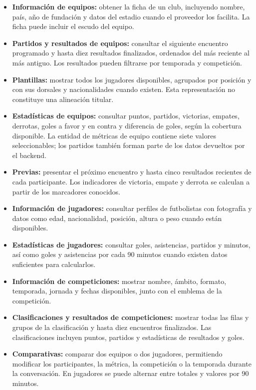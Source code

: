 \documentclass[11pt,a4paper]{article}
\begin{document}
\begin{itemize}
\item \textbf{Información de equipos:} obtener la ficha de un club, incluyendo nombre, país, año de fundación y datos del estadio cuando el proveedor los facilita. La ficha puede incluir el escudo del equipo.
\item \textbf{Partidos y resultados de equipos:} consultar el siguiente encuentro programado y hasta diez resultados finalizados, ordenados del más reciente al más antiguo. Los resultados pueden filtrarse por temporada y competición.
\item \textbf{Plantillas:} mostrar todos los jugadores disponibles, agrupados por posición y con sus dorsales y nacionalidades cuando existen. Esta representación no constituye una alineación titular.
\item \textbf{Estadísticas de equipos:} consultar puntos, partidos, victorias, empates, derrotas, goles a favor y en contra y diferencia de goles, según la cobertura disponible. La entidad de métricas de equipo contiene siete valores seleccionables; los partidos también forman parte de los datos devueltos por el backend.
\item \textbf{Previas:} presentar el próximo encuentro y hasta cinco resultados recientes de cada participante. Los indicadores de victoria, empate y derrota se calculan a partir de los marcadores conocidos.
\item \textbf{Información de jugadores:} consultar perfiles de futbolistas con fotografía y datos como edad, nacionalidad, posición, altura o peso cuando están disponibles.
\item \textbf{Estadísticas de jugadores:} consultar goles, asistencias, partidos y minutos, así como goles y asistencias por cada 90 minutos cuando existen datos suficientes para calcularlos.
\item \textbf{Información de competiciones:} mostrar nombre, ámbito, formato, temporada, jornada y fechas disponibles, junto con el emblema de la competición.
\item \textbf{Clasificaciones y resultados de competiciones:} mostrar todas las filas y grupos de la clasificación y hasta diez encuentros finalizados. Las clasificaciones incluyen puntos, partidos y estadísticas de resultados y goles.
\item \textbf{Comparativas:} comparar dos equipos o dos jugadores, permitiendo modificar los participantes, la métrica, la competición o la temporada durante la conversación. En jugadores se puede alternar entre totales y valores por 90 minutos.

\end{itemize}
\end{document}
